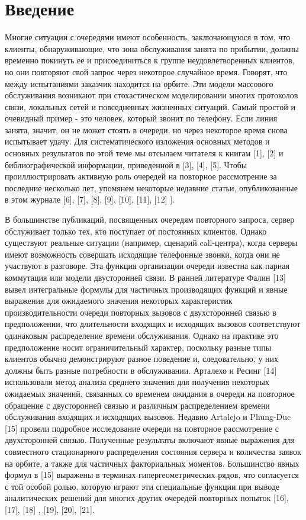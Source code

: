 \section {Введение}
Многие ситуации с очередями имеют особенность, заключающуюся в том, что клиенты, обнаруживающие, что зона обслуживания занята по прибытии, должны временно покинуть ее и присоединиться к группе неудовлетворенных клиентов, но они повторяют свой запрос через некоторое случайное время. Говорят, что между испытаниями заказчик находится на орбите. Эти модели массового обслуживания возникают при стохастическом моделировании многих протоколов связи, локальных сетей и повседневных жизненных ситуаций. Самый простой и очевидный пример - это человек, который звонит по телефону. Если линия занята, значит, он не может стоять в очереди, но через некоторое время снова испытывает удачу. Для систематического изложения основных методов и основных результатов по этой теме мы отсылаем читателя к книгам [1], [2] и библиографической информации, приведенной в [3], [4], [5]. Чтобы проиллюстрировать активную роль очередей на повторное рассмотрение за последние несколько лет, упомянем некоторые недавние статьи, опубликованные в этом журнале [6], [7], [8], [9], [10], [11], [12] ].

В большинстве публикаций, посвященных очередям повторного запроса, сервер обслуживает только тех, кто поступает от постоянных клиентов. Однако существуют реальные ситуации (например, сценарий call-центра), когда серверы имеют возможность совершать исходящие телефонные звонки, когда они не участвуют в разговоре. Эта функция организации очереди известна как парная коммутация или модели двусторонней связи. В ранней литературе Фалин [13] вывел интегральные формулы для частичных производящих функций и явные выражения для ожидаемого значения некоторых характеристик производительности очереди повторных вызовов с двухсторонней связью в предположении, что длительности входящих и исходящих вызовов соответствуют одинаковым распределение времени обслуживания. Однако на практике это предположение носит ограничительный характер, поскольку разные типы клиентов обычно демонстрируют разное поведение и, следовательно, у них должны быть разные потребности в обслуживании. Арталехо и Ресинг [14] использовали метод анализа среднего значения для получения некоторых ожидаемых значений, связанных со временем ожидания в очереди на повторное обращение с двусторонней связью и различным распределением времени обслуживания входящих и исходящих вызовов. Недавно Artalejo и Phung-Duc [15] провели подробное исследование очереди на повторное рассмотрение с двухсторонней связью. Полученные результаты включают явные выражения для совместного стационарного распределения состояния сервера и количества заявок на орбите, а также для частичных факториальных моментов. Большинство явных формул в [15] выражены в терминах гипергеометрических рядов, что согласуется с той особой ролью, которую играют эти специальные функции при выводе аналитических решений для многих других очередей повторных попыток [16], [17], [18] , [19], [20], [21].

